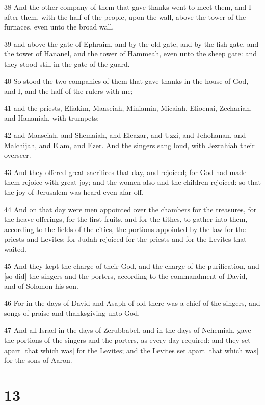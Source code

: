 \par 38 And the other company of them that gave thanks went to meet them, and I after them, with the half of the people, upon the wall, above the tower of the furnaces, even unto the broad wall,
\par 39 and above the gate of Ephraim, and by the old gate, and by the fish gate, and the tower of Hananel, and the tower of Hammeah, even unto the sheep gate: and they stood still in the gate of the guard.
\par 40 So stood the two companies of them that gave thanks in the house of God, and I, and the half of the rulers with me;
\par 41 and the priests, Eliakim, Maaseiah, Miniamin, Micaiah, Elioenai, Zechariah, and Hananiah, with trumpets;
\par 42 and Maaseiah, and Shemaiah, and Eleazar, and Uzzi, and Jehohanan, and Malchijah, and Elam, and Ezer. And the singers sang loud, with Jezrahiah their overseer.
\par 43 And they offered great sacrifices that day, and rejoiced; for God had made them rejoice with great joy; and the women also and the children rejoiced: so that the joy of Jerusalem was heard even afar off.
\par 44 And on that day were men appointed over the chambers for the treasures, for the heave-offerings, for the first-fruits, and for the tithes, to gather into them, according to the fields of the cities, the portions appointed by the law for the priests and Levites: for Judah rejoiced for the priests and for the Levites that waited.
\par 45 And they kept the charge of their God, and the charge of the purification, and [so did] the singers and the porters, according to the commandment of David, and of Solomon his son.
\par 46 For in the days of David and Asaph of old there was a chief of the singers, and songs of praise and thanksgiving unto God.
\par 47 And all Israel in the days of Zerubbabel, and in the days of Nehemiah, gave the portions of the singers and the porters, as every day required: and they set apart [that which was] for the Levites; and the Levites set apart [that which was] for the sons of Aaron.

\chapter{13}

